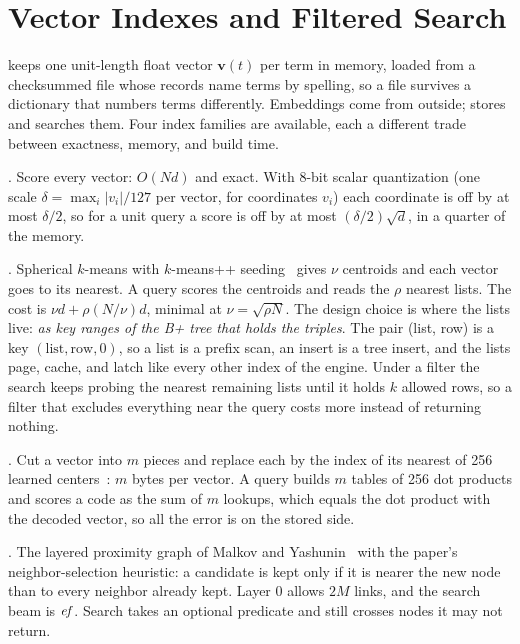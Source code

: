 \section{Vector Indexes and Filtered Search}
\label{sec-vectors}

\sys keeps one unit-length float vector $\mathbf{v}(t)$ per term in memory,
loaded from a checksummed file whose records name terms by spelling, so a
file survives a dictionary that numbers terms differently.
Embeddings come from outside; \sys stores and searches them.
Four index families are available, each a different trade between
exactness, memory, and build time.

.
Score every vector: $O(Nd)$ and exact.
With 8-bit scalar quantization (one scale $\delta=\max_i|v_i|/127$ per vector, for coordinates $v_i$) each
coordinate is off by at most $\delta/2$, so for a unit query a score is off by at
most $(\delta/2)\sqrt d$, in a quarter of the memory.

.
Spherical $k$-means with $k$-means++ seeding~\cite{arthur2007} gives $\nu$
centroids and each vector goes to its nearest.
A query scores the centroids and reads the $\rho$ nearest lists.
The cost is $\nu d+\rho (N/\nu) d$, minimal at $\nu=\sqrt{\rho N}$.
The design choice is where the lists live: \emph{as key ranges of the B+ tree
that holds the triples}.
The pair (list, row) is a key $(\mathrm{list},\mathrm{row},0)$, so a list is a
prefix scan, an insert is a tree insert, and the lists page, cache, and latch
like every other index of the engine.
Under a filter the search keeps probing the nearest remaining lists until it
holds $k$ allowed rows, so a filter that excludes everything near the query
costs more instead of returning nothing.

.
Cut a vector into $m$ pieces and replace each by the index of its nearest of
256 learned centers~\cite{jegou2011}: $m$ bytes per vector.
A query builds $m$ tables of 256 dot products and scores a code as the sum of
$m$ lookups, which equals the dot product with the decoded vector, so all the
error is on the stored side.

.
The layered proximity graph of Malkov and Yashunin~\cite{malkov2020} with the
paper's neighbor-selection heuristic: a candidate is kept only if it is
nearer the new node than to every neighbor already kept.
Layer 0 allows $2M$ links, and the search beam is $\mathit{ef}$.
Search takes an optional predicate and still crosses nodes it may not return.

